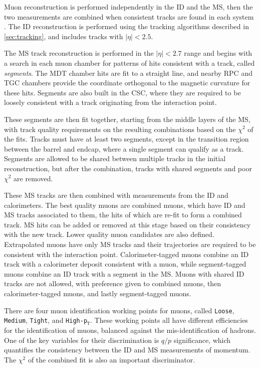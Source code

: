 Muon reconstruction is performed independently in the \ac{ID} and the \ac{MS}, then the two measurements are combined when consistent tracks are found in each system \cite{1603.05598}. The \ac{ID} reconstruction is performed using the tracking algorithms described in \autoref{sec:tracking}, and includes tracks with $|\eta|<2.5$. 

The \ac{MS} track reconstruction is performed in the $|\eta|<2.7$ range and begins with a search in each muon chamber for patterns of hits consistent with a track, called \textit{segments}. The \ac{MDT} chamber hits are fit to a straight line, and nearby \ac{RPC} and \ac{TGC} chambers provide the coordinate orthogonal to the magnetic curvature for these hits. Segments are also built in the \ac{CSC}, where they are required to be loosely consistent with a track originating from the interaction point. 

These segments are then fit together, starting from the middle layers of the \ac{MS}, with track quality requirements on the resulting combinations based on the $\chi^2$ of the fits. Tracks must have at least two segments, except in the transition region between the barrel and endcap, where a single segment can qualify as a track. Segments are allowed to be shared between multiple tracks in the initial reconstruction, but after the combination, tracks with shared segments and poor $\chi^2$ are removed.    

These \ac{MS} tracks are then combined with measurements from the \ac{ID} and calorimeters. The best quality muons are combined muons, which have \ac{ID} and \ac{MS} tracks associated to them, the hits of which are re-fit to form a combined track. \ac{MS} hits can be added or removed at this stage based on their consistency with the new track. Lower quality muon candidates are also defined. Extrapolated muons have only \ac{MS} tracks and their trajectories are required to be consistent with the interaction point. Calorimeter-tagged muons combine an \ac{ID} track with a calorimeter deposit consistent with a muon, while segment-tagged muons combine an \ac{ID} track with a segment in the \ac{MS}. Muons with shared \ac{ID} tracks are not allowed, with preference given to combined muons, then calorimeter-tagged muons, and lastly segment-tagged muons. 

There are four muon identification working points for muons, called \texttt{Loose}, \texttt{Medium}, \texttt{Tight}, and \texttt{High-p$_\texttt{T}$}. These working points all have different efficiencies for the identification of muons, balanced against the mis-identification of hadrons. One of the key variables for their discrimination is $q/p$ significance, which quantifies the consistency between the \ac{ID} and \ac{MS} measurements of momentum. The $\chi^2$ of the combined fit is also an important discriminator. 

